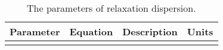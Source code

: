 \begin{landscape}
\begin{center}
\begin{small}

\begin{longtable}{llll}

\caption[The parameters of relaxation dispersion.]{The parameters of relaxation dispersion.}

\\
\toprule
Parameter          & Equation                       & Description                                                                   & Units \\
\midrule
\endhead

\bottomrule
\endfoot

\label{table: dispersion parameters}


\end{longtable}
\end{small}
\end{center}
\end{landscape}

